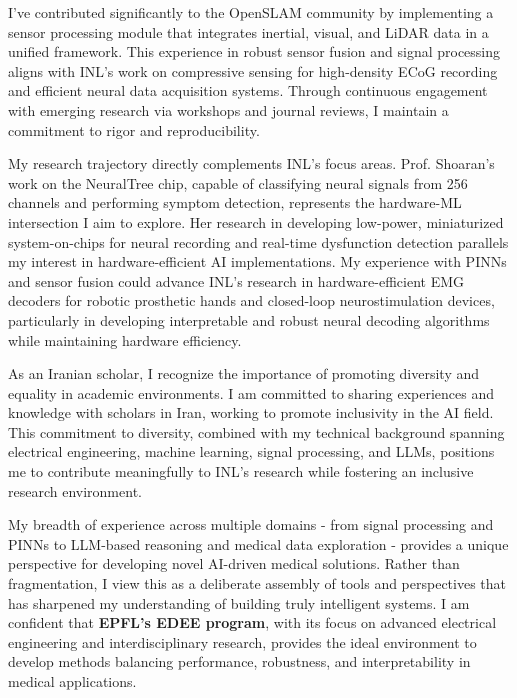 \documentclass[a4,10pt]{article}
\begin{document}
\begin{large}
\vspace{-0.25cm} \quad I've contributed significantly to the OpenSLAM community by implementing a sensor processing module that integrates inertial, visual, and LiDAR data in a unified framework. This experience in robust sensor fusion and signal processing aligns with INL's work on compressive sensing for high-density ECoG recording and efficient neural data acquisition systems. Through continuous engagement with emerging research via workshops and journal reviews, I maintain a commitment to rigor and reproducibility.
\par
\vspace{-0.25cm} \quad My research trajectory directly complements INL's focus areas. Prof. Shoaran's work on the NeuralTree chip, capable of classifying neural signals from 256 channels and performing symptom detection, represents the hardware-ML intersection I aim to explore. Her research in developing low-power, miniaturized system-on-chips for neural recording and real-time dysfunction detection parallels my interest in hardware-efficient AI implementations. My experience with PINNs and sensor fusion could advance INL's research in hardware-efficient EMG decoders for robotic prosthetic hands and closed-loop neurostimulation devices, particularly in developing interpretable and robust neural decoding algorithms while maintaining hardware efficiency.
\par
\vspace{-0.25cm} \quad As an Iranian scholar, I recognize the importance of promoting diversity and equality in academic environments. I am committed to sharing experiences and knowledge with scholars in Iran, working to promote inclusivity in the AI field. This commitment to diversity, combined with my technical background spanning electrical engineering, machine learning, signal processing, and LLMs, positions me to contribute meaningfully to INL's research while fostering an inclusive research environment.
\par
\vspace{-0.25cm} \quad My breadth of experience across multiple domains - from signal processing and PINNs to LLM-based reasoning and medical data exploration - provides a unique perspective for developing novel AI-driven medical solutions. Rather than fragmentation, I view this as a deliberate assembly of tools and perspectives that has sharpened my understanding of building truly intelligent systems. I am confident that \textbf{EPFL's EDEE program}, with its focus on advanced electrical engineering and interdisciplinary research, provides the ideal environment to develop methods balancing performance, robustness, and interpretability in medical applications.

\end{large}
\end{document}

